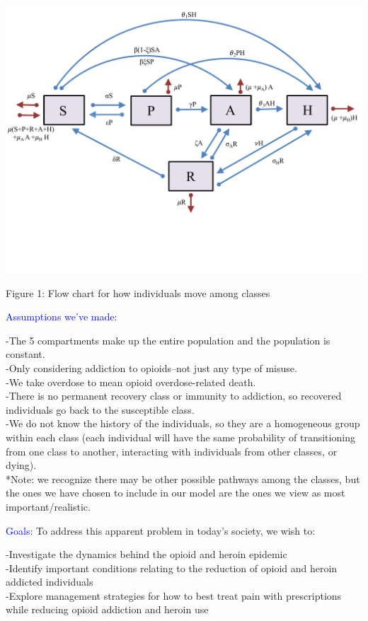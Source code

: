\documentclass[12pt]{article}
\begin{document}
\vspace{-0.4cm}
\hspace{1.2cm}
\includegraphics[scale=0.5]{heroin_schematic.pdf}
\vspace{-1cm}
\begin{center}
Figure 1: Flow chart for how individuals move among classes
\end{center} 

\textcolor{blue}{Assumptions we've made:} 

-The 5 compartments make up the entire population and the population is constant. \\
-Only considering addiction to opioids--not just any type of misuse. \\
-We take overdose to mean opioid overdose-related death. \\
-There is no permanent recovery class or immunity to addiction, so recovered individuals go back to the susceptible class. \\
-We do not know the history of the individuals, so they are a homogeneous group within each class (each individual will have the same probability of transitioning from one class to another, interacting with individuals from other classes, or dying). \\
*Note: we recognize there may be other possible pathways among the classes, but the ones we have chosen to include in our model are the ones we view as most important/realistic. 


\textcolor{blue}{Goals:}  
To address this apparent problem in today's society, we wish to: 

-Investigate the dynamics behind the opioid and heroin epidemic \\
-Identify important conditions relating to the reduction of opioid and heroin addicted individuals \\
-Explore management strategies for how to best treat pain with prescriptions while reducing opioid addiction and heroin use \\
\end{document}
